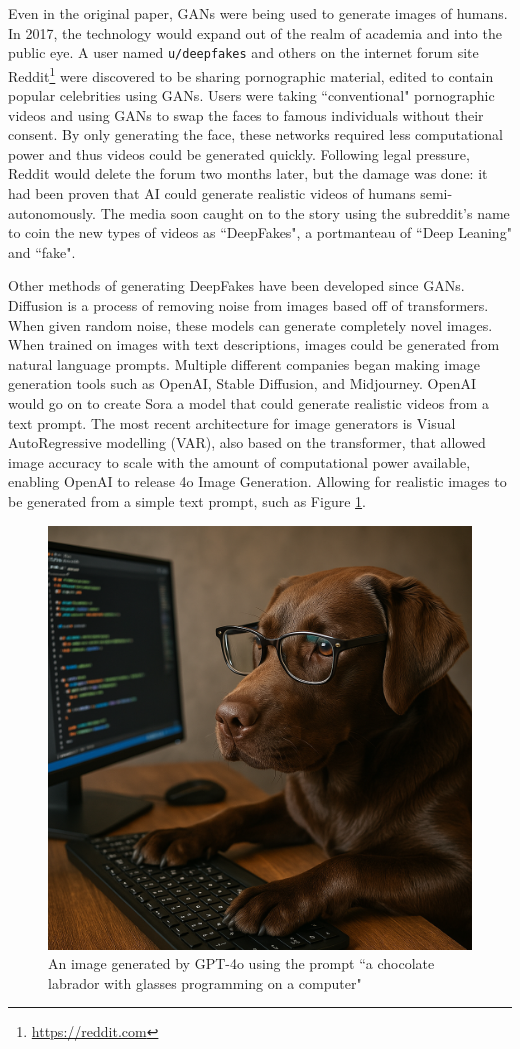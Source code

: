 Even in the original paper, GANs were being used to generate images of humans\cite{goodfellow2014generative}. In 2017, the technology would expand out of the realm of academia and into the public eye. A user named \verb|u/deepfakes| and others on the internet forum site Reddit\footnote{\url{https://reddit.com}} were discovered to be sharing pornographic material, edited to contain popular celebrities using GANs\cite{cole2018reddit}. Users were taking ``conventional" pornographic videos and using GANs to swap the faces to famous individuals without their consent. By only generating the face, these networks required less computational power and thus videos could be generated quickly. Following legal pressure, Reddit would delete the forum two months later\cite{cole2018reddit}, but the damage was done: it had been proven that AI could generate realistic videos of humans semi-autonomously. The media soon caught on to the story using the subreddit's name to coin the new types of videos as ``DeepFakes", a portmanteau of ``Deep Leaning" and ``fake".

Other methods of generating DeepFakes have been developed since GANs. Diffusion\cite{rombach2022high} is a process of removing noise from images based off of transformers\cite{vaswani2017attention}. When given random noise, these models can generate completely novel images. When trained on images with text descriptions, images could be generated from natural language prompts. Multiple different companies began making image generation tools such as OpenAI\cite{ramesh2022hierarchical}, Stable Diffusion\cite{stablediffusion2022}, and Midjourney\cite{midjourney2022}. OpenAI would go on to create Sora\cite{brooks2024video} a model that could generate realistic videos from a text prompt. The most recent architecture for image generators is Visual AutoRegressive modelling (VAR)\cite{tian2024visual}, also based on the transformer, that allowed image accuracy to scale with the amount of computational power available, enabling OpenAI to release 4o Image Generation\cite{4oimagegen}. Allowing for realistic images to be generated from a simple text prompt, such as Figure \ref{fig:gpt4o-dog}.

\begin{figure}[h]
    \centering
    \includegraphics[width=0.5\linewidth]{dissertation//figures/gpt4o.png}
    \caption{An image generated by GPT-4o\cite{4oimagegen} using the prompt ``a chocolate labrador with glasses programming on a computer"}
    \label{fig:gpt4o-dog}
\end{figure}

